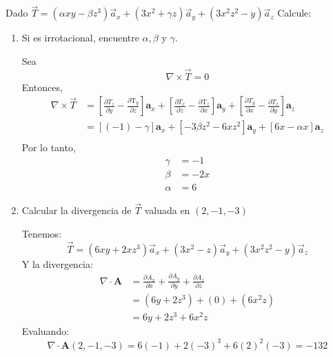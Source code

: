 \begin{problema}
    Dado $\vec{T}=\left(\alpha x y-\beta z^3\right) \vec{a}_x+\left(3 x^2+\gamma z\right) \vec{a}_y+\left(3 x^2 z^2-y\right) \vec{a}_z$
Calcule:
\begin{enumerate}
    \item Si es irrotacional, encuentre $\alpha, \beta$ y $\gamma$.
    \begin{sol}
        Sea 
        $$\nabla\times \Vec{T}=0$$
        Entonces,
        \begin{align*}
            \nabla\times \Vec{T} &={\left[\frac{\partial T_z}{\partial y}-\frac{\partial \mathrm{T}_y}{\partial z}\right] \mathbf{a}_x+\left[\frac{\partial T_x}{\partial z}-\frac{\partial \mathrm{T}_z}{\partial x}\right] \mathbf{a}_y } +\left[\frac{\partial T_y}{\partial x}-\frac{\partial T_x}{\partial y}\right] \mathbf{a}_z\\
            &={\left[(-1)-\gamma\right] \mathbf{a}_x+\left[-3\beta z^2-6xz^2\right] \mathbf{a}_y } +\left[ 6x-\alpha x\right] \mathbf{a}_z\\
        \end{align*}
        Por lo tanto, 
        \begin{align*}
            \gamma &= -1\\
            \beta &= -2x\\
            \alpha &= 6
        \end{align*}
    \end{sol}
    \item Calcular la divergencia de $\vec{T}$ valuada en $(2,-1,-3)$
    \begin{sol}
        Tenemos: 
        $$\vec{T}=\left(6 x y+2xz^3\right) \vec{a}_x+\left(3 x^2- z\right) \vec{a}_y+\left(3 x^2 z^2-y\right) \vec{a}_z$$
        Y la divergencia: 
        \begin{align*}
            \nabla \cdot \mathbf{A} &=\frac{\partial A_x}{\partial x}+\frac{\partial A_y}{\partial y}+\frac{\partial A_z}{\partial z}\\
            &= (6y+2z^3)+(0)+(6x^2z)\\
            &= 6y+2z^3+6x^2z
        \end{align*}
        Evaluando: 
        $$\nabla \cdot \mathbf{A}(2,-1,-3)=6(-1)+2(-3)^3+6(2)^2(-3)=-132$$
    \end{sol}
\end{enumerate}

\end{problema}

